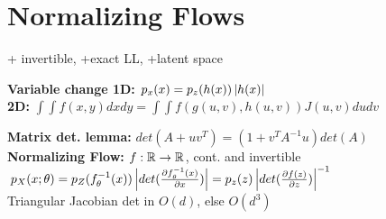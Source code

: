 \section{Normalizing Flows}
+ invertible, +exact LL, +latent space\\

\textbf{Variable change 1D:} $p_x(x) = p_z(h(x)) \left\lvert h(x) \right\rvert$\\
\textbf{2D:} $\int \int f(x,y) dxdy = \int \int f(g(u,v), h(u,v)) J(u,v) dudv$\\

\textbf{Matrix det. lemma:} $det(A + uv^T) = (1 + v^T A^{-1} u) det(A)$\\

\textbf{Normalizing Flow:} $f: \mathbb{R} \rightarrow \mathbb{R}$, cont. and invertible\\
$p_X(x; \theta) = p_Z(f_\theta^{-1}(x)) \left\lvert det(\frac{\partial f_\theta^{-1}(x)}{\partial x}) \right\rvert
= p_z(z) \left\lvert det(\frac{\partial f(z)}{\partial z}) \right\rvert^{-1}$\\
Triangular Jacobian det in $O(d)$, else $O(d^3)$\\


